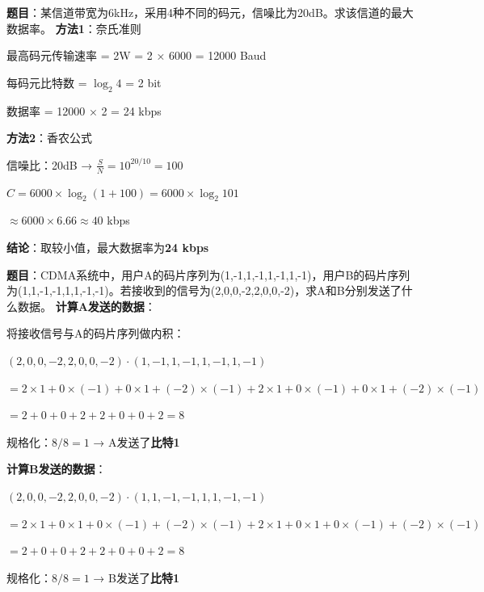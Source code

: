 \begin{examplebox}[例题2.6 信道容量综合]
\textbf{题目}：某信道带宽为6kHz，采用4种不同的码元，信噪比为20dB。求该信道的最大数据率。
\tcblower
\textbf{方法1}：奈氏准则

最高码元传输速率 = 2W = 2 × 6000 = 12000 Baud

每码元比特数 = $\log_2 4$ = 2 bit

数据率 = 12000 × 2 = 24 kbps

\textbf{方法2}：香农公式

信噪比：20dB → $\frac{S}{N} = 10^{20/10} = 100$

$C = 6000 \times \log_2(1+100) = 6000 \times \log_2 101$

$\approx 6000 \times 6.66 \approx 40$ kbps

\textbf{结论}：取较小值，最大数据率为\textbf{24 kbps}
\end{examplebox}

\begin{examplebox}[例题2.7 CDMA码片序列]
\textbf{题目}：CDMA系统中，用户A的码片序列为(1,-1,1,-1,1,-1,1,-1)，用户B的码片序列为(1,1,-1,-1,1,1,-1,-1)。若接收到的信号为(2,0,0,-2,2,0,0,-2)，求A和B分别发送了什么数据。
\tcblower
\textbf{计算A发送的数据}：

将接收信号与A的码片序列做内积：

$(2,0,0,-2,2,0,0,-2) \cdot (1,-1,1,-1,1,-1,1,-1)$

$= 2×1 + 0×(-1) + 0×1 + (-2)×(-1) + 2×1 + 0×(-1) + 0×1 + (-2)×(-1)$

$= 2 + 0 + 0 + 2 + 2 + 0 + 0 + 2 = 8$

规格化：$8/8 = 1$ → A发送了\textbf{比特1}

\textbf{计算B发送的数据}：

$(2,0,0,-2,2,0,0,-2) \cdot (1,1,-1,-1,1,1,-1,-1)$

$= 2×1 + 0×1 + 0×(-1) + (-2)×(-1) + 2×1 + 0×1 + 0×(-1) + (-2)×(-1)$

$= 2 + 0 + 0 + 2 + 2 + 0 + 0 + 2 = 8$

规格化：$8/8 = 1$ → B发送了\textbf{比特1}
\end{examplebox}
